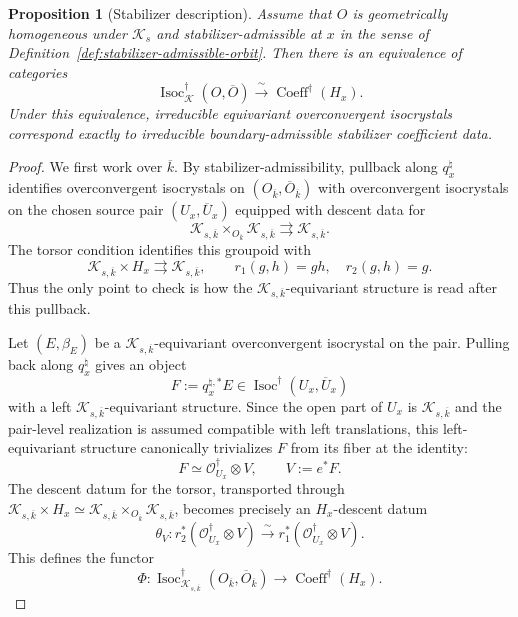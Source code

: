 \documentclass[11pt]{amsart}
\theoremstyle{plain}
\newtheorem{proposition}{Proposition}[section]
\theoremstyle{definition}
\theoremstyle{remark}
\newcommand{\Isoc}{\operatorname{Isoc}}
\newcommand{\Coeff}{\operatorname{Coeff}}
\begin{document}
\begin{proposition}[Stabilizer description]
\label{prop:stabilizer-description}
Assume that \(O\) is geometrically homogeneous under \(\mathcal K_s\) and
stabilizer-admissible at \(x\) in the sense of
Definition~\ref{def:stabilizer-admissible-orbit}.  Then there is an equivalence
of categories
\begin{equation}
\label{eq:stabilizer-equivalence}
  \Isoc^{\dagger}_{\mathcal K}(O,\overline O)
  \xrightarrow{\;\sim\;}
  \Coeff^{\dagger}(H_x).
\end{equation}
Under this equivalence, irreducible equivariant overconvergent isocrystals
correspond exactly to irreducible boundary-admissible stabilizer coefficient
data.
\end{proposition}

\begin{proof}
We first work over \(\overline k\).  By stabilizer-admissibility, pullback along
\(q_x^\natural\) identifies overconvergent isocrystals on
\((O_{\overline k},\overline O_{\overline k})\) with overconvergent isocrystals
on the chosen source pair \((U_x,\overline U_x)\) equipped with descent data for
\[
  \mathcal K_{s,\overline k}\times_{O_{\overline k}}
  \mathcal K_{s,\overline k}
\rightrightarrows \mathcal K_{s,\overline k}.
\]
The torsor condition identifies this groupoid with
\[
  \mathcal K_{s,\overline k}\times H_x
\rightrightarrows
  \mathcal K_{s,\overline k},
  \qquad
  r_1(g,h)=gh,
  \quad r_2(g,h)=g.
\]
Thus the only point to check is how the \(\mathcal K_{s,\overline k}\)-equivariant
structure is read after this pullback.

Let \((E,\beta_E)\) be a \(\mathcal K_{s,\overline k}\)-equivariant
overconvergent isocrystal on the pair.  Pulling back along \(q_x^\natural\)
gives an object
\[
  F:=q_x^{\natural,*}E\in \Isoc^\dagger(U_x,\overline U_x)
\]
with a left \(\mathcal K_{s,\overline k}\)-equivariant structure.  Since the
open part of \(U_x\) is \(\mathcal K_{s,\overline k}\) and the pair-level
realization is assumed compatible with left translations, this left-equivariant
structure canonically trivializes \(F\) from its fiber at the identity:
\[
  F\simeq \mathcal O^\dagger_{U_x}\otimes V,
  \qquad V:=e^*F.
\]
The descent datum for the torsor, transported through
\(\mathcal K_{s,\overline k}\times H_x\simeq
\mathcal K_{s,\overline k}\times_{O_{\overline k}}\mathcal K_{s,\overline k}\),
becomes precisely an \(H_x\)-descent datum
\[
  \theta_V:r_2^*(\mathcal O^\dagger_{U_x}\otimes V)
  \xrightarrow{\sim}
  r_1^*(\mathcal O^\dagger_{U_x}\otimes V).
\]
This defines the functor
\[
  \Phi:
  \Isoc^\dagger_{\mathcal K_{s,\overline k}}(O_{\overline k},\overline O_{\overline k})
  \longrightarrow \Coeff^\dagger(H_x).
\]


\end{proof}
\end{document}
